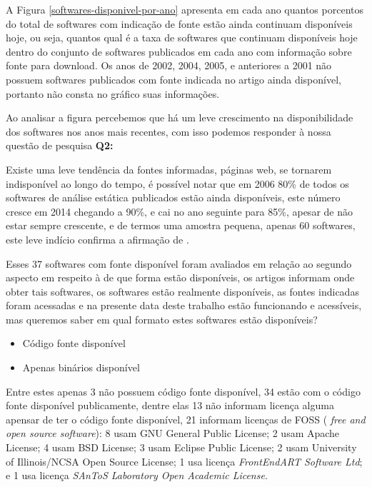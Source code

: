 A Figura \ref{softwares-disponivel-por-ano} apresenta em cada ano quantos
porcentos do total de softwares com indicação de fonte estão ainda continuam
disponíveis hoje, ou seja, quantos qual é a taxa de softwares que continuam
disponíveis hoje dentro do conjunto de softwares publicados em cada ano com
informação sobre fonte para download.  Os anos de 2002, 2004, 2005, e
anteriores a 2001 não possuem softwares publicados com fonte indicada no artigo
ainda disponível, portanto não consta no gráfico suas informações.

Ao analisar a figura percebemos que há um leve crescimento na disponibilidade
dos softwares nos anos mais recentes, com isso podemos responder à nossa
questão de pesquisa {\bf Q2:} \QuestaoDois

Existe uma leve tendência da fontes informadas, páginas web, se tornarem
indisponível ao longo do tempo, é possível notar que em 2006 80\% de todos os
softwares de análise estática publicados estão ainda disponíveis, este número
cresce em 2014 chegando a 90\%, e cai no ano seguinte para 85\%, apesar de não
estar sempre crescente, e de termos uma amostra pequena, apenas 60 softwares,
este leve indício confirma a afirmação de .

Esses 37 softwares com fonte disponível foram avaliados em relação ao segundo
aspecto em respeito à de que forma estão disponíveis, os artigos informam onde
obter tais softwares, os softwares estão realmente disponíveis, as fontes
indicadas foram acessadas e na presente data deste trabalho estão funcionando e
acessíveis, mas queremos saber em qual formato estes softwares estão
disponíveis?

\begin{itemize}
  \item Código fonte disponível
  \item Apenas binários disponível
\end{itemize}

Entre estes apenas 3 não possuem código fonte disponível, 34 estão com o código
fonte disponível publicamente, dentre elas 13 não informam licença alguma
apensar de ter o código fonte disponível, 21 informam licenças de FOSS ({\it
free and open source software}):
8 usam GNU General Public License;
2 usam Apache License;
4 usam BSD License;
3 usam Eclipse Public License;
2 usam University of Illinois/NCSA Open Source License;
1 usa licença {\it FrontEndART Software Ltd}; e
1 usa licença {\it SAnToS Laboratory Open Academic License}.

